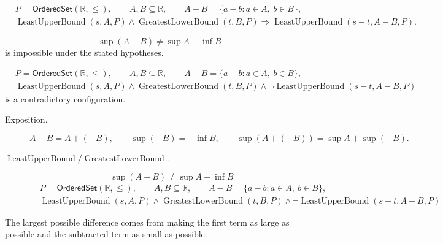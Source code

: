 \begin{remark*}
\[
\begin{aligned}
&P=\mathsf{OrderedSet}(\mathbb{R},\leq),\qquad A,B\subseteq\mathbb{R},\qquad A-B=\{a-b:a\in A,\ b\in B\},\\
&\operatorname{LeastUpperBound}(s,A,P)\land \operatorname{GreatestLowerBound}(t,B,P)
\Longrightarrow
\operatorname{LeastUpperBound}(s-t,A-B,P).
\end{aligned}
\]
\end{remark*}

\begin{remark*}
\[
\sup(A-B)\ne \sup A-\inf B
\]
is impossible under the stated hypotheses.
\end{remark*}

\begin{remark*}
\[
\begin{aligned}
&P=\mathsf{OrderedSet}(\mathbb{R},\leq),\qquad A,B\subseteq\mathbb{R},\qquad A-B=\{a-b:a\in A,\ b\in B\},\\
&\operatorname{LeastUpperBound}(s,A,P)\land \operatorname{GreatestLowerBound}(t,B,P)
\land
\neg\operatorname{LeastUpperBound}(s-t,A-B,P)
\end{aligned}
\]
is a contradictory configuration.
\end{remark*}

\begin{remark*}
\begin{description}
  \item[Exposition.]
\[
A-B=A+(-B),
\qquad
\sup(-B)=-\inf B,
\qquad
\sup(A+(-B))=\sup A+\sup(-B).
\]


  \item[\(\operatorname{LeastUpperBound} / \operatorname{GreatestLowerBound}.\)]
  \[
\sup(A-B)\ne \sup A-\inf B
\]
\[
\begin{aligned}
&P=\mathsf{OrderedSet}(\mathbb{R},\leq),\qquad A,B\subseteq\mathbb{R},\qquad A-B=\{a-b:a\in A,\ b\in B\},\\
&\operatorname{LeastUpperBound}(s,A,P)\land \operatorname{GreatestLowerBound}(t,B,P)
\land
\neg\operatorname{LeastUpperBound}(s-t,A-B,P)
\end{aligned}
\]
\end{description}
\end{remark*}

\begin{remark*}[Interpretation]
The largest possible difference comes from making the first term as large as possible and the subtracted term as small as possible.
\end{remark*}

